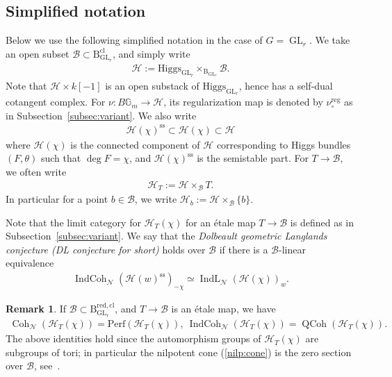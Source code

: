 \documentclass[11pt,oneside,a4paper,mathscr]{amsart}
\theoremstyle{definition}
\newtheorem{remark}[thm]{Remark}
\newcommand{\QCoh}{\operatorname{QCoh}}
\newcommand{\cH}{\mathcal{H}}
\newcommand{\cB}{\mathcal{B}}
\newcommand{\bgm}{B\mathbb{G}_m}
\newcommand{\rB}{\mathrm{B}}
\newcommand{\Coh}{\operatorname{Coh}}
\newcommand{\IndCoh}{\operatorname{IndCoh}}
\newcommand{\IndL}{\operatorname{IndL}}
\newcommand{\GL}{\operatorname{GL}}
\newcommand{\Hig}{\mathrm{Higgs}}
\begin{document}
\subsection{Simplified notation}
Below we use the following simplified notation
in the case of $G=\GL_r$. We take  
 an open subset $\cB \subset \rB_{\GL_r}^{\mathrm{cl}}$, 
 and simply write 
\begin{align}\label{sH}
    \cH:=\Hig_{\GL_r}\times_{\rB_{\GL_r}} \cB.
\end{align}
Note that $\cH \times k[-1]$ is an open substack of $\Hig_{\GL_r}$, hence 
has a self-dual cotangent complex. For $\nu \colon \bgm \to \cH$, its 
regularization map is denoted by $\nu_{\circ}^{\mathrm{reg}}$ as in Subsection~\ref{subsec:variant}.
We also write 
\begin{align*}
    \cH(\chi)^{\mathrm{ss}} \subset \cH(\chi) \subset \cH
\end{align*}
where $\cH(\chi)$ is 
the connected component of $\cH$
corresponding to Higgs bundles $(F, \theta)$ such that $\deg F=\chi$, 
and $\cH(\chi)^{\mathrm{ss}}$ is the semistable part. 
For $T \to \cB$, we often write 
\begin{align*}\cH_T:=\cH\times_{\cB}T.
\end{align*}
In particular for a point $b\in \cB$, we write 
$\cH_b:=\cH\times_{\cB}\{b\}$.

Note that the limit category for $\cH_T(\chi)$
for an \'etale map $T\to \cB$ 
is defined as in Subsection~\ref{subsec:variant}. 
We say that the \textit{Dolbeault geometric Langlands conjecture (DL conjecture for short)}
holds over $\cB$ if there is a $\cB$-linear equivalence
\begin{align}\label{equiv:H}
    \IndCoh_{\mathcal{N}}(\cH(w)^{\mathrm{ss}})_{-\chi} \simeq \IndL_{\mathcal{N}}(\cH(\chi))_w.
\end{align}



\begin{remark}\label{rmk:nilp}
If $\cB \subset \rB_{\GL_r}^{\mathrm{red, cl}}$, and $T\to \cB$ 
is an \'etale map, we have 
\begin{align*}
   \Coh_{\mathcal{N}}(\cH_T(\chi))=\mathrm{Perf}(\cH_T(\chi)), \ 
   \IndCoh_{\mathcal{N}}(\cH_T(\chi))=\QCoh(\cH_T(\chi)).
\end{align*}
The above identities hold since the automorphism groups of $\cH_T(\chi)$ 
are subgroups of tori; in particular the nilpotent cone (\ref{nilp:cone}) is the zero section 
over $\cB$, see~\cite[Lemma~4.1]{TodaGL2}. 
\end{remark}
\end{document}
